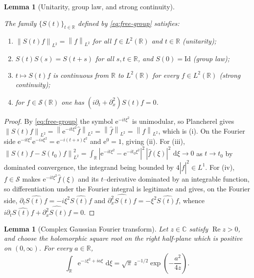 \documentclass[11pt,oneside]{book}
\providecommand{\uses}[1]{}
\newtheorem{lemma}[theorem]{Lemma}
\theoremstyle{definition}
\theoremstyle{remark}
\newcommand{\R}{\mathbb R}
\newcommand{\C}{\mathbb C}
\newcommand{\Ssch}{\mathcal S}
\newcommand{\1}{\mathbf 1}
\newcommand{\Rea}{\operatorname{Re}}
\newcommand{\dd}{\,\mathrm d}
\newcommand{\norm}[1]{\left\lVert #1\right\rVert}
\newcommand{\e}{\mathrm e}
\begin{document}
\begin{lemma}[Unitarity, group law, and strong continuity]
\label{lem:propagator-unitary}
\uses{def:propagator}
The family $\{S(t)\}_{t\in\R}$ defined by \eqref{eq:free-group} satisfies:
\begin{enumerate}
\item[(i)] $\norm{S(t)f}_{L^2}=\norm f_{L^2}$ for all $f\in L^2(\R)$ and
      $t\in\R$ (unitarity);
\item[(ii)] $S(t)S(s)=S(t+s)$ for all $s,t\in\R$, and $S(0)=\mathrm{Id}$
      (group law);
\item[(iii)] $t\mapsto S(t)f$ is continuous from $\R$ to $L^2(\R)$ for every
      $f\in L^2(\R)$ (strong continuity);
\item[(iv)] for $f\in\Ssch(\R)$ one has $(i\partial_t+\partial_x^2)S(t)f=0$.
\end{enumerate}
\end{lemma}

\begin{proof}
\uses{def:propagator}
By \eqref{eq:free-group} the symbol $\e^{-it\xi^2}$ is unimodular, so
Plancherel gives $\norm{S(t)f}_{L^2}=\norm{\e^{-it\xi^2}\widehat f}_{L^2}
=\norm{\widehat f}_{L^2}=\norm f_{L^2}$, which is (i).  On the Fourier side
$\e^{-it\xi^2}\e^{-is\xi^2}=\e^{-i(t+s)\xi^2}$ and $\e^{0}=1$, giving (ii).
For (iii), $\norm{S(t)f-S(t_0)f}_{L^2}^2=\int_\R
|\e^{-it\xi^2}-\e^{-it_0\xi^2}|^2\,|\widehat f(\xi)|^2\,\dd\xi\to0$ as
$t\to t_0$ by dominated convergence, the integrand being bounded by
$4|\widehat f|^2\in L^1$.  For (iv), $f\in\Ssch$ makes $\e^{-it\xi^2}\widehat
f(\xi)$ and its $t$--derivative dominated by an integrable function, so
differentiation under the Fourier integral is legitimate and gives, on the
Fourier side, $\partial_t\widehat{S(t)f}=-i\xi^2\widehat{S(t)f}$ and
$\widehat{\partial_x^2 S(t)f}=-\xi^2\widehat{S(t)f}$, whence
$i\partial_t\widehat{S(t)f}+\widehat{\partial_x^2 S(t)f}=0$.
\end{proof}

\begin{lemma}[Complex Gaussian Fourier transform]
\label{lem:complex-gaussian-kernel}
Let $z\in\C$ satisfy $\Rea z>0$, and choose the holomorphic square root on
the right half-plane which is positive on $(0,\infty)$.  For every $a\in\R$,
\begin{equation}
 \int_\R \e^{-z\xi^2+ia\xi}\,\dd\xi
 =\sqrt\pi\,z^{-1/2}\exp\!\left(-\frac{a^2}{4z}\right).
 \label{eq:complex-gaussian}
\end{equation}
\end{lemma}
\end{document}
